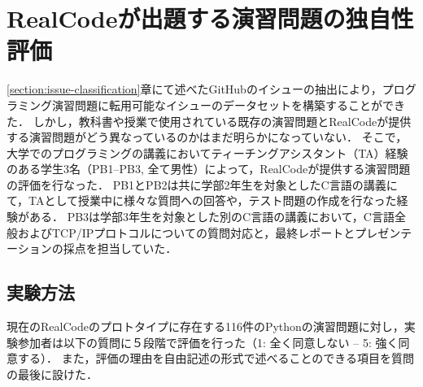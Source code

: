 \chapter{RealCodeが出題する演習問題の独自性評価}
\graphicspath{{Chapter5/Figs/}}


\label{section:ta_evaluation}


\ref{section:issue-classification}章にて述べたGitHubのイシューの抽出により，プログラミング演習問題に転用可能なイシューのデータセットを構築することができた．
しかし，教科書や授業で使用されている既存の演習問題とRealCodeが提供する演習問題がどう異なっているのかはまだ明らかになっていない．
そこで，大学でのプログラミングの講義においてティーチングアシスタント（TA）経験のある学生3名（PB1--PB3, 全て男性）によって，RealCodeが提供する演習問題の評価を行なった．
PB1とPB2は共に学部2年生を対象としたC言語の講義にて，TAとして授業中に様々な質問への回答や，テスト問題の作成を行なった経験がある．
PB3は学部3年生を対象とした別のC言語の講義において，C言語全般およびTCP/IPプロトコルについての質問対応と，最終レポートとプレゼンテーションの採点を担当していた．


\section{実験方法}
現在のRealCodeのプロトタイプに存在する116件のPythonの演習問題に対し，実験参加者は以下の質問に５段階で評価を行った（1: 全く同意しない -- 5: 強く同意する）．
また，評価の理由を自由記述の形式で述べることのできる項目を質問の最後に設けた．


